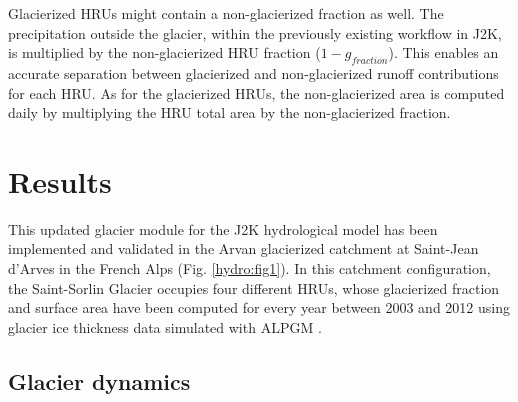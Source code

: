 Glacierized HRUs might contain a non-glacierized fraction as well. The precipitation outside the glacier, within the previously existing workflow in J2K, is multiplied by the non-glacierized HRU fraction ($1 - g_{fraction}$). This enables an accurate separation between glacierized and non-glacierized runoff contributions for each HRU. As for the glacierized HRUs, the non-glacierized area is computed daily by multiplying the HRU total area by the non-glacierized fraction.

\section{Results}

This updated glacier module for the J2K hydrological model has been implemented and validated in the Arvan glacierized catchment at Saint-Jean d'Arves in the French Alps (Fig. \ref{hydro:fig1}). In this catchment configuration, the Saint-Sorlin Glacier occupies four different HRUs, whose glacierized fraction and surface area have been computed for every year between 2003 and 2012 using glacier ice thickness data simulated with ALPGM \citep{bolibar_alpgm_2020}.

\subsection{Glacier dynamics}


